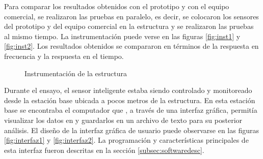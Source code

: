 Para comparar los resultados obtenidos con el prototipo y con el equipo comercial, se realizaron las pruebas en paralelo, es decir, se colocaron los sensores del prototipo y del equipo comercial en la estructura y se realizaron las pruebas al mismo tiempo. La instrumentación puede verse en las figuras \ref{fig:inst1} y \ref{fig:inst2}. Los resultados obtenidos se compararon en términos de la respuesta en frecuencia y la respuesta en el tiempo.


\begin{figure}[H]
    \centering
    \hfill
    \caption{Instrumentación de la estructura}
    \label{fig:inst}
\end{figure}

Durante el ensayo, el sensor inteligente estaba siendo controlado y monitoreado desde la estación base ubicada a pocos metros de la estructura. En esta estación base se encontraba el computador que , a través de una interfaz gráfica, permitía visualizar los datos en y guardarlos en un archivo de texto para su posterior análisis. El diseño de la interfaz gráfica de usuario puede observarse en las figuras \ref{fig:interfaz1} y \ref{fig:interfaz2}. La programación y características principales de esta interfaz fueron descritas en la sección \ref{subsec:softwaredesc}.


